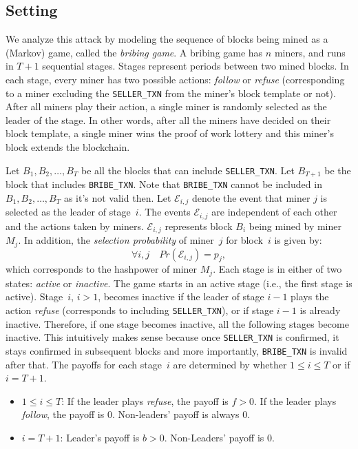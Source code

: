 \documentclass[runningheads]{llncs}
\newcommand{\sellertxn}{\texttt{SELLER\_TXN}}
\newcommand{\bribetxn}{\texttt{BRIBE\_TXN}}
\newcommand{\refuse}{\emph{refuse}}
\newcommand{\follow}{\emph{follow}}
\begin{document}
\subsection{Setting}
We analyze this attack by modeling the sequence of blocks being mined as a (Markov) game, called the \emph{bribing game}. A bribing game has $n$ miners, and runs in $T+1$ sequential stages. Stages represent periods between two mined blocks. In each stage, every miner has two possible actions: \follow{} or \refuse{} (corresponding to a miner excluding the \sellertxn{} from the miner's block template or not). After all miners play their action, a single miner is randomly selected as the leader of the stage. In other words, after all the miners have decided on their block template, a single miner wins the proof of work lottery and this miner's block extends the blockchain. 

Let $B_1, B_2, \ldots, B_{T}$ be all the blocks that can include \sellertxn{}. Let $B_{T+1}$ be the block that includes \bribetxn{}. Note that \bribetxn{} cannot be included in $B_1, B_2, \ldots, B_{T}$ as it's not valid then. Let $\mathcal{E}_{i,j}$ denote the event that miner $j$ is selected as the leader of stage~$i$. The events $\mathcal{E}_{i,j}$ are independent of each other and the actions taken by miners. $\mathcal{E}_{i,j}$ represents block $B_i$ being mined by miner $M_j$. In addition, the \emph{selection probability} of miner~$j$ for block~$i$ is given by:  
\[
  \forall i,j \quad Pr(\mathcal{E}_{i,j})= p_j,
\]
which corresponds to the hashpower of miner $M_j$. Each stage is in either of two states: \emph{active} or \emph{inactive}. The game starts in an active stage (i.e., the first stage is active). Stage~$i$, $i>1$, becomes inactive if the leader of stage $i-1$ plays the action \refuse{} (corresponds to including \sellertxn{}), or if stage $i-1$ is already inactive. Therefore, if one stage becomes inactive, all the following stages become inactive. This intuitively makes sense because once \sellertxn{} is confirmed, it stays confirmed in subsequent blocks and more importantly, \bribetxn{} is invalid after that. The payoffs for each stage~$i$ are determined by whether $1\leq i\leq T$ or if $i=T+1$.
\begin{itemize}
    \item $1\leq i\leq T$: If the leader plays \refuse{}, the payoff is $f>0$. If the leader plays \follow{}, the payoff is 0. Non-leaders' payoff is always 0.
    \item $i=T+1$: Leader's payoff is $b>0$. Non-Leaders' payoff is 0.
\end{itemize}
\end{document}
